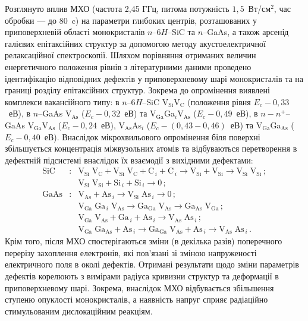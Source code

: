 Розглянуто вплив МХО (частота 2,45 ГГц, питома потужність  $1,5$~Вт/см$^2$, час обробки --- до 80~c) на параметри глибоких центрів, розташованих у приповерхневій області монокристалів $n$--6$H$--SiC та $n$--GaAs, а також арсенід галієвих епітаксійних структур за допомогою методу акустоелектричної релаксаційної спектроскопії.
Шляхом порівняння отриманих величин енергетичного положення рівнів з літературними даними проведено ідентифікацію відповідних дефектів у приповерхневому шарі монокристалів та на границі розділу епітаксійних структур.
Зокрема до опромінення виявлені комплекси вакансійного типу:
в $n$--6$H$--SiC V$_\text{Si}$V$_\text{C}$ (положення рівня $E_c-0,33$~еВ),
в $n$--GaAs V$_\text{As}$ ($E_c-0,32$~еВ) та V$_\text{Ga}$Ga$_i$V$_\text{As}$ ($E_c-0,49$~еВ),
в $n-n^+$--GaAs V$_\text{Ga}$V$_\text{As}$ ($E_c-0,24$~еВ), V$_\text{As}$As$_i$ ($E_c-(0,43-0,46)$~еВ) та V$_\text{Ga}$Ga$_\text{As}$ ($E_c-0,40$~еВ).
Внаслідок мікрохвильового опромінення біля поверхні збільшується концентрація міжвузольних атомів та відбуваються перетворення в дефектній
підсистемі внаслідок їх взаємодії з вихідними дефектами:
\begin{eqnarray*}
  \text{SiC}&:&\text{V}_\text{Si}\;\text{V}_\text{C}+\text{V}_\text{Si}\;\text{V}_\text{C}+\text{C}_{\,i}+ \text{C}_{\,i} \rightarrow \text{V}_\text{Si}+ \text{V}_\text{Si}\rightarrow \text{V}_\text{Si}\;\text{V}_\text{Si}\,;\\
  &&\text{V}_\text{Si}\;\text{V}_\text{Si}+\text{Si}_{\,i}+ \text{Si}_{\,i} \rightarrow 0\,;\\
  \text{GaAs}&:&\text{V}_\text{As}+ \text{As}_{\,i} \rightarrow\text{V}_\text{Si}\;\text{As}_{\,i} \rightarrow 0\,;\\
   &&  \text{V}_\text{Ga}\;\text{Ga}_{\,i}\;\text{V}_\text{As}\rightarrow \text{Ga}_\text{Ga}\;\text{V}_\text{As}
  \rightarrow \text{Ga}_\text{As}\;\text{V}_\text{Ga} \,;\\
  &&\text{V}_\text{Ga}\;\text{V}_\text{As}+\text{Ga}_{\,i}+\text{As}_{\,i} \rightarrow \text{V}_\text{As}\;\text{As}_{\,i}\,;\\
  &&  \text{V}_\text{Ga}\;\text{Ga}_\text{As}+\text{As}_{\,i} \rightarrow
  \text{Ga}_\text{Ga}\;\text{V}_\text{As}+\text{As}_{\,i} \rightarrow
  \text{V}_\text{As}\;\text{As}_{\,i}\,.
\end{eqnarray*}
Крім того, після МХО спостерігаються зміни (в декілька разів) поперечного перерізу захоплення електронів,
які пов'язані зі зміною напруженості електричного поля в околі дефектів.
Отримані результати щодо зміни параметрів дефектів корелюють з вимірами радіуса кривизни структур та деформації в приповерхневому шарі.
Зокрема, внаслідок МХО відбувається збільшення ступеню опуклості монокристалів, а наявність напруг сприяє радіаційно стимульованим дислокаційним реакціям.



